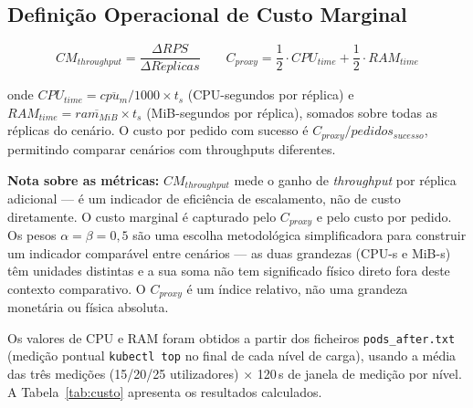 \documentclass[acmsmall,screen=true,nonacm]{acmart}
\begin{document}
\subsection{Definição Operacional de Custo Marginal}

\[
CM_{throughput} = \frac{\Delta RPS}{\Delta R\acute{e}plicas}
\qquad
C_{proxy} = \frac{1}{2} \cdot CPU_{time} + \frac{1}{2} \cdot RAM_{time}
\]

onde $CPU_{time} = \overline{cpu_{m}} / 1000 \times t_{s}$ (CPU-segundos por réplica) e $RAM_{time} = \overline{ram_{MiB}} \times t_{s}$ (MiB-segundos por réplica), somados sobre todas as réplicas do cenário. O custo por pedido com sucesso é $C_{proxy} / pedidos_{sucesso}$, permitindo comparar cenários com throughputs diferentes.

\textbf{Nota sobre as métricas:} $CM_{throughput}$ mede o ganho de \textit{throughput} por réplica adicional — é um indicador de eficiência de escalamento, não de custo diretamente. O custo marginal é capturado pelo $C_{proxy}$ e pelo custo por pedido. Os pesos $\alpha = \beta = 0{,}5$ são uma escolha metodológica simplificadora para construir um indicador comparável entre cenários — as duas grandezas (CPU-s e MiB-s) têm unidades distintas e a sua soma não tem significado físico direto fora deste contexto comparativo. O $C_{proxy}$ é um índice relativo, não uma grandeza monetária ou física absoluta.

Os valores de CPU e RAM foram obtidos a partir dos ficheiros \texttt{pods\_after.txt} (medição pontual \texttt{kubectl top} no final de cada nível de carga), usando a média das três medições (15/20/25 utilizadores) × 120\,s de janela de medição por nível. A Tabela~\ref{tab:custo} apresenta os resultados calculados.

\begin{table}[h]
\caption{Custo proxy calculado para C1, C2 e C3 (testes comparativos, 15/20/25 utilizadores, $t_{total}=360$\,s). Unidades: CPU\_time em CPU-s; RAM\_time em MiB-s; C\_proxy = 0{,}5$\times$CPU\_time + 0{,}5$\times$RAM\_time; custo/pedido em unidades proxy por pedido com sucesso.}
\label{tab:custo}
\end{table}
\end{document}
